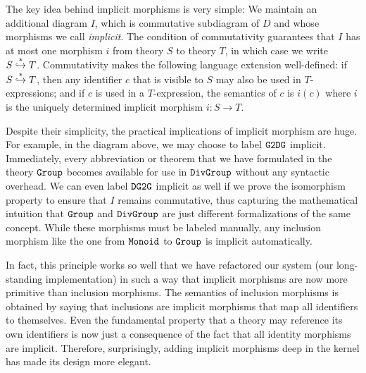 The key idea behind implicit morphisms is very simple:
We maintain an additional diagram $I$, which is commutative subdiagram of $D$ and whose morphisms we call \emph{implicit}.
The condition of commutativity guarantees that $I$ has at most one morphism $i$ from theory $S$ to theory $T$, in which case we write $S\stackrel{\ast}{\hookrightarrow}T$.
Commutativity makes the following language extension well-defined: if $S\stackrel{\ast}{\hookrightarrow}T$, then any identifier $c$ that is visible to $S$ may also be used in $T$-expressions; and if $c$ is used in a $T$-expression, the semantics of $c$ is $i(c)$ where $i$ is the uniquely determined implicit morphism $i:S\to T$.

Despite their simplicity, the practical implications of implicit morphism are huge.
For example, in the diagram above, we may choose to label $\operatorname{\mathtt{G2DG}}$ implicit.
Immediately, every abbreviation or theorem that we have formulated in the theory $\operatorname{\mathtt{Group}}$ becomes available for use in $\operatorname{\mathtt{DivGroup}}$ without any syntactic overhead.
We can even label $\operatorname{\mathtt{DG2G}}$ implicit as well if we prove the isomorphism property to ensure that $I$ remains commutative, thus capturing the mathematical intuition that $\operatorname{\mathtt{Group}}$ and $\operatorname{\mathtt{DivGroup}}$ are just different formalizations of the same concept.
While these morphisms must be labeled manually, any inclusion morphism like the one from $\operatorname{\mathtt{Monoid}}$ to $\operatorname{\mathtt{Group}}$ is implicit automatically.

In fact, this principle works so well that we have refactored our \mmt system (our long-standing implementation) in such a way that implicit morphisms are now more primitive than inclusion morphisms.
The semantics of inclusion morphisms is obtained by saying that inclusions are implicit morphisms that map all identifiers to themselves.
Even the fundamental property that a theory may reference its own identifiers is now just a consequence of the fact that all identity morphisms are implicit.
Therefore, surprisingly, adding implicit morphisms deep in the \mmt kernel has made its design more elegant.